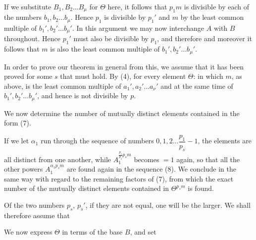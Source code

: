 
If we substitute $B_1, B_2 \ldots B_\mu$ for $\Theta$ here, it follows that $p_1 m$
is divisible by each of the numbers $b_1, b_2 \ldots b_\mu$. Hence $p_1$ is
divisible by $p_1'$ and $m$ by the least common
multiple of $b_1', b_2' \ldots b_\mu'$. In this argument we may now
interchange $A$ with $B$ throughout. Hence $p_1'$ must also be divisible
by $p_1$, and therefore
and moreover it follows that $m$ is also the least common
 multiple of $b_1', b_2' \ldots b_\mu'$.

In order to prove our theorem in general from this, we assume
that it has been proved for some $s$ that
must hold. By (4), for every element $\Theta$:
in which $m$, as above, is the least common multiple of
$a_1', a_2' \ldots a_\nu'$ and at the same time of $b_1', b_2' \ldots b_\mu'$, and hence is not
divisible by $p$.

We now determine the number of mutually distinct
 elements contained in the form (7).

If we let $\alpha_1$ run through the sequence of numbers $0, 1, 2 \ldots \dfrac{p_1}{p_s} - 1$,
the elements
are all distinct from one another, while $A_1^{\frac{p_1}{p_s} p_s m}$ becomes $= 1$
again, so that all the other powers $A_1^{\alpha_1 p_s m}$ are found again in the
sequence (8). We conclude in the same way with regard to the remaining
factors of (7), from which the exact number of the mutually
 distinct elements contained in $\Theta^{p_s m}$
is found.

Of the two numbers $p_s$, $p_s'$, if they are not equal,
one will be the larger. We shall therefore assume that

We now express $\Theta$ in terms of the base $B$, and set
